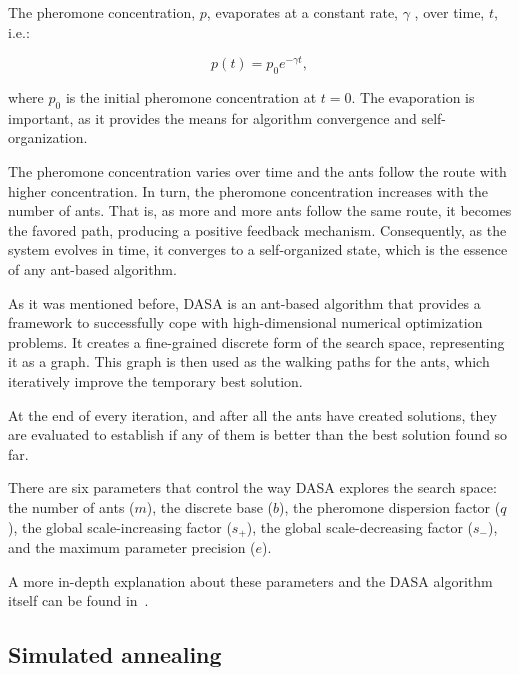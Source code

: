 The pheromone concentration, $p$, evaporates at a constant rate,
$\gamma$ , over time, $t$, i.e.:

\begin{equation}
p(t)=p_{0}e^{-\gamma t},\label{eq:02-ACO_structure}
\end{equation}


\noindent where $p_{0}$ is the initial pheromone concentration at
$t=0$. The evaporation is important, as it provides the means for
algorithm convergence and self-organization.

The pheromone concentration varies over time and the ants follow the
route with higher concentration. In turn, the pheromone concentration
increases with the number of ants. That is, as more and more ants
follow the same route, it becomes the favored path, producing a positive
feedback mechanism. Consequently, as the system evolves in time, it
converges to a self-organized state, which is the essence of any ant-based
algorithm. 

\bigskip{}


As it was mentioned before, DASA is an ant-based algorithm that provides
a framework to successfully cope with high-dimensional numerical optimization
problems. It creates a fine-grained discrete form of the search space,
representing it as a graph. This graph is then used as the walking
paths for the ants, which iteratively improve the temporary best solution. 

At the end of every iteration, and after all the ants have created
solutions, they are evaluated to establish if any of them is better
than the best solution found so far.

There are six parameters that control the way DASA explores the search
space: the number of ants ($m$), the discrete base ($b$), the pheromone
dispersion factor ($q$), the global scale-increasing factor ($s_{+}$),
the global scale-decreasing factor ($s_{-}$), and the maximum parameter
precision ($e$).

A more in-depth explanation about these parameters and the DASA algorithm
itself can be found in~\cite{korosec2010_DASA}.


\subsection{Simulated annealing \label{sub:02-SA}}

